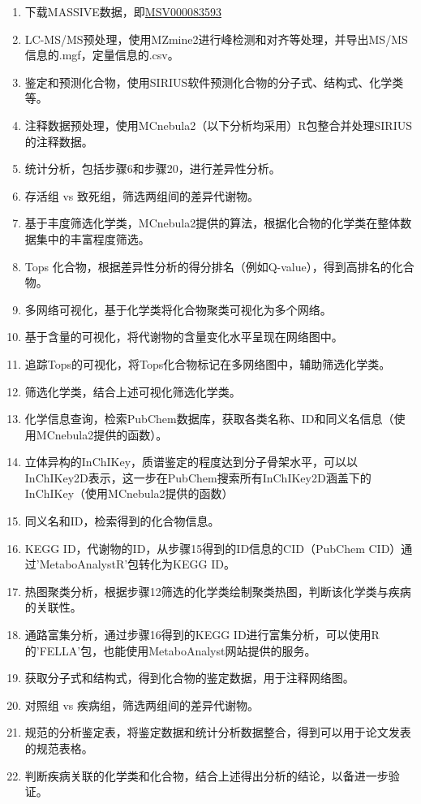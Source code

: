 \documentclass[
]{article}
\providecommand{\tightlist}{%
  \setlength{\itemsep}{0pt}\setlength{\parskip}{0pt}}
\begin{document}
\begin{enumerate}
\def\labelenumi{\arabic{enumi}.}
\tightlist
\item
  下载MASSIVE数据，即\href{https://massive.ucsd.edu/ProteoSAFe/QueryMSV?id=MSV000083593}{MSV000083593}
\item
  LC-MS/MS预处理，使用MZmine2进行峰检测和对齐等处理，并导出MS/MS信息的.mgf，定量信息的.csv。
\item
  鉴定和预测化合物，使用SIRIUS软件预测化合物的分子式、结构式、化学类等。
\item
  注释数据预处理，使用MCnebula2（以下分析均采用）R包整合并处理SIRIUS的注释数据。
\item
  统计分析，包括步骤6和步骤20，进行差异性分析。
\item
  存活组 vs 致死组，筛选两组间的差异代谢物。
\item
  基于丰度筛选化学类，MCnebula2提供的算法，根据化合物的化学类在整体数据集中的丰富程度筛选。
\item
  Tops 化合物，根据差异性分析的得分排名（例如Q-value），得到高排名的化合物。
\item
  多网络可视化，基于化学类将化合物聚类可视化为多个网络。
\item
  基于含量的可视化，将代谢物的含量变化水平呈现在网络图中。
\item
  追踪Tops的可视化，将Tops化合物标记在多网络图中，辅助筛选化学类。
\item
  筛选化学类，结合上述可视化筛选化学类。
\item
  化学信息查询，检索PubChem数据库，获取各类名称、ID和同义名信息（使用MCnebula2提供的函数）。
\item
  立体异构的InChIKey，质谱鉴定的程度达到分子骨架水平，可以以InChIKey2D表示，这一步在PubChem搜索所有InChIKey2D涵盖下的InChIKey（使用MCnebula2提供的函数）
\item
  同义名和ID，检索得到的化合物信息。
\item
  KEGG ID，代谢物的ID，从步骤15得到的ID信息的CID（PubChem CID）通过'MetaboAnalystR'包转化为KEGG ID。
\item
  热图聚类分析，根据步骤12筛选的化学类绘制聚类热图，判断该化学类与疾病的关联性。
\item
  通路富集分析，通过步骤16得到的KEGG ID进行富集分析，可以使用R的'FELLA'包，也能使用MetaboAnalyst网站提供的服务。
\item
  获取分子式和结构式，得到化合物的鉴定数据，用于注释网络图。
\item
  对照组 vs 疾病组，筛选两组间的差异代谢物。
\item
  规范的分析鉴定表，将鉴定数据和统计分析数据整合，得到可以用于论文发表的规范表格。
\item
  判断疾病关联的化学类和化合物，结合上述得出分析的结论，以备进一步验证。
\end{enumerate}
\end{document}
